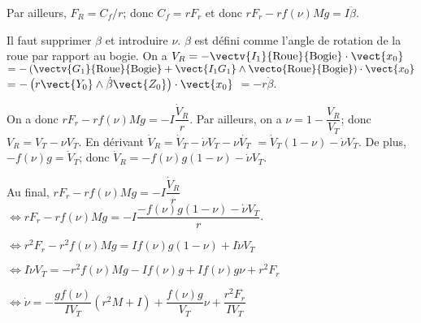 Par ailleurs, $F_R=C_f/r$; donc $C_f=rF_r$ et donc $rF_r -rf(\nu)Mg = I\ddot{\beta}$. 
\vspace{.5cm}


Il faut supprimer $\beta$ et introduire $\nu$. $\beta$ est défini comme l'angle de rotation de la roue par rapport au bogie. On a $V_R=-\vectv{I_1}{\text{Roue}}{\text{Bogie}} \cdot\vect{x_0}$ $=-\left(\vectv{G_1}{\text{Roue}}{\text{Bogie}} +\vect{I_1G_1} \wedge \vecto{\text{Roue}}{\text{Bogie}}\right)\cdot\vect{x_0}$
$=-\left(r\vect{Y_0} \wedge \dot{\beta}\vect{Z_0}\right)\cdot\vect{x_0}$
$=-r \dot{\beta}$.

On a donc $rF_r -rf(\nu)Mg = - I\dfrac{\dot{V}_R}{r}$. Par ailleurs, on a $\nu = 1- \dfrac{V_R}{V_T}$; donc 
$ V_R= V_T-\nu V_T$. En dérivant $ \dot{V}_R= \dot{V}_T-\dot{\nu} V_T-\nu \dot{V_T}$ 
$= \dot{V}_T \left(1-\nu \right) -\dot{\nu} V_T$. De plus, $-f(\nu) g = \dot{V}_T$; donc $ \dot{V}_R=-f(\nu) g \left(1-\nu \right) -\dot{\nu} V_T$.

\vspace{.5cm}

Au final,  $rF_r -rf(\nu)Mg = - I\dfrac{\dot{V}_R}{r}$ $\Leftrightarrow rF_r -rf(\nu)Mg = - I\dfrac{-f(\nu) g \left(1-\nu \right) -\dot{\nu} V_T}{r}$.   


$\Leftrightarrow r^2F_r -r^2f(\nu)Mg = If(\nu) g \left(1-\nu \right) +I\dot{\nu} V_T$

$\Leftrightarrow I\dot{\nu} V_T =      -r^2f(\nu)Mg - If(\nu) g +  If(\nu) g \nu  + r^2F_r$

$\Leftrightarrow \dot{\nu}=-\dfrac{gf(\nu)}{IV_T}\left(r^2M +I \right) +  \dfrac{f(\nu) g}{V_T} \nu  + \dfrac{r^2F_r}{IV_T}$

   

%
%
% 
% 
% 

